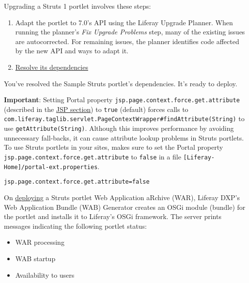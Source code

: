 Upgrading a Struts 1 portlet involves these steps:

\begin{enumerate}
\def\labelenumi{\arabic{enumi}.}
\item
  Adapt the portlet to 7.0's API using the Liferay Upgrade Planner. When
  running the planner's \emph{Fix Upgrade Problems} step, many of the
  existing issues are autocorrected. For remaining issues, the planner
  identifies code affected by the new API and ways to adapt it.
\item
  \href{/docs/7-2/tutorials/-/knowledge_base/t/resolving-a-projects-dependencies}{Resolve
  its dependencies}
\end{enumerate}

You've resolved the Sample Struts portlet's dependencies. It's ready to
deploy.

\noindent\hrulefill

\textbf{Important}: Setting Portal property
\texttt{jsp.page.context.force.get.attribute} (described in the
\href{https://docs.liferay.com/dxp/portal/7.2-latest/propertiesdoc/portal.properties.html\#JSP}{JSP
section}) to \texttt{true} (default) forces calls to
\texttt{com.liferay.taglib.servlet.PageContextWrapper\#findAttribute(String)}
to use \texttt{getAttribute(String)}. Although this improves performance
by avoiding unnecessary fall-backs, it can cause attribute lookup
problems in Struts portlets. To use Struts portlets in your sites, makes
sure to set the Portal property
\texttt{jsp.page.context.force.get.attribute} to \texttt{false} in a
file \texttt{{[}Liferay-Home{]}/portal-ext.properties}.

\begin{verbatim}
jsp.page.context.force.get.attribute=false
\end{verbatim}

\noindent\hrulefill

On
\href{/docs/7-2/reference/-/knowledge_base/r/deploying-a-project}{deploying}
a Struts portlet Web Application aRchive (WAR), Liferay DXP's Web
Application Bundle (WAB) Generator creates an OSGi module (bundle) for
the portlet and installs it to Liferay's OSGi framework. The server
prints messages indicating the following portlet status:

\begin{itemize}
\tightlist
\item
  WAR processing
\item
  WAB startup
\item
  Availability to users
\end{itemize}

